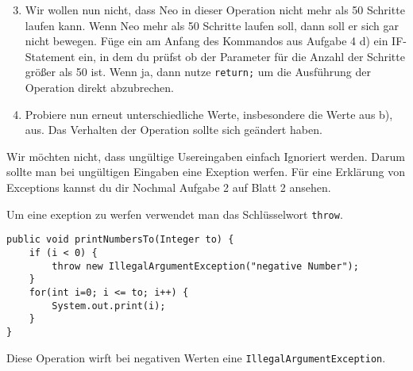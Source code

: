 \begin{enumerate}\setcounter{enumi}{2}
	\item
		Wir wollen nun nicht, dass Neo in dieser Operation nicht mehr als 50 Schritte laufen kann. 
		Wenn Neo mehr als 50 Schritte laufen soll, dann soll er sich gar nicht bewegen.
		Füge ein am Anfang des Kommandos aus Aufgabe 4 d) ein IF-Statement ein, in dem du prüfst ob der Parameter für die Anzahl der Schritte größer als 50 ist.
		Wenn ja, dann nutze \lstinline{return;} um die Ausführung der Operation direkt abzubrechen.

	\item
		Probiere nun erneut unterschiedliche Werte, insbesondere die Werte aus b), aus.
		Das Verhalten der Operation sollte sich geändert haben.
\end{enumerate}

\medskip %

\begin{Infobox}
	Wir möchten nicht, dass ungültige Usereingaben einfach Ignoriert werden. 
	Darum sollte man bei ungültigen Eingaben eine Exeption werfen.
	Für eine Erklärung von Exceptions kannst du dir Nochmal Aufgabe 2 auf Blatt 2 ansehen.

	Um eine exeption zu werfen verwendet man das Schlüsselwort \lstinline{throw}.

	\begin{lstlisting}[xleftmargin=0.5cm]
public void printNumbersTo(Integer to) {
    if (i < 0) {
        throw new IllegalArgumentException("negative Number");	
    }
    for(int i=0; i <= to; i++) {
        System.out.print(i);
    }
}
	\end{lstlisting}
	
	Diese Operation wirft bei negativen Werten eine \lstinline{IllegalArgumentException}.
\end{Infobox}



